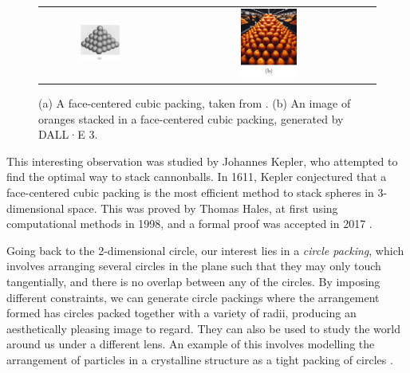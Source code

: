 \begin{figure}[htbp]
    \centering
    \begin{tabular}{c c}
      \includegraphics[width = 0.35\textwidth]{Chapter 1/2. Cubic packing.png}   & \includegraphics[width = 0.275\textwidth]{Chapter 1/oranges.png}
    \end{tabular}
    \caption{(a) A face-centered cubic packing, taken from \cite{kepler}. (b) An image of oranges stacked in a face-centered cubic packing, generated by DALL·E 3.}
\end{figure}
\vspace{-4 mm}
\begin{flushleft}
This interesting observation was studied by Johannes Kepler, who attempted to find the optimal way to stack cannonballs. In 1611, Kepler conjectured that a face-centered cubic packing is the most efficient method to stack spheres in 3-dimensional space. This was proved by Thomas Hales, at first using computational methods in 1998, and a formal proof was accepted in 2017 \cite{Kepler_proof}.
\end{flushleft}

\begin{flushleft}
Going back to the 2-dimensional circle, our interest lies in a \textit{circle packing}, which involves arranging several circles in the plane such that they may only touch tangentially, and there is no overlap between any of the circles. By imposing different constraints, we can generate circle packings where the arrangement formed has circles packed together with a variety of radii, producing an aesthetically pleasing image to regard. They can also be used to study the world around us under a different lens. An example of this involves modelling the arrangement of particles in a crystalline structure as a tight packing of circles \cite{crystalline}.
\end{flushleft}


